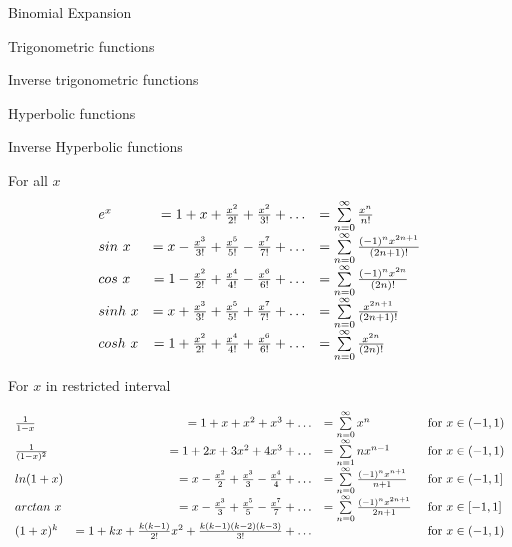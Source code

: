 \begin{framed}
 Binomial Expansion

 Trigonometric functions

 Inverse trigonometric functions

 Hyperbolic functions

 Inverse Hyperbolic functions
\fi

For all $x$
\[
   \begin{array}{l r l}
   e^x &= 1 + x + \frac{x^2}{2!} + \frac{x^2}{3!} + \hdots &= \sum\limits_{n=0}^{\infty}  \frac{x^n}{n!} \\
   sin\ x &= x - \frac{x^3}{3!} + \frac{x^5}{5!} - \frac{x^7}{7!} + \hdots &= \sum\limits_{n=0}^{\infty} \frac{(-1)^n x^{2n+1}}{(2n+1)! } \\
   cos\ x &= 1 - \frac{x^2}{2!} + \frac{x^4}{4!} - \frac{x^6}{6!} + \hdots &= \sum\limits_{n=0}^{\infty}  \frac{(-1)^n x^{2n}}{(2n)!} \\
   sinh\ x &= x + \frac{x^3}{3!} + \frac{x^5}{5!} + \frac{x^7}{7!} + \hdots &= \sum\limits_{n=0}^{\infty} \frac{x^{2n+1}}{(2n+1)! } \\
   cosh\ x &= 1 + \frac{x^2}{2!} + \frac{x^4}{4!} + \frac{x^6}{6!} + \hdots &= \sum\limits_{n=0}^{\infty}  \frac{ x^{2n}}{(2n)!}
\end{array}
\] 

For $x$ in restricted interval

\[
\begin{array}{l r l l}
   \frac{1}{1-x} &= 1 + x + x^2 + x^3 + \hdots &= \sum\limits_{n=0}^{\infty}  x^n & \text{ for $x \in (-1, 1)$} \\
   \frac{1}{(1-x)^2} &= 1 + 2x + 3x^2 + 4x^3 + \hdots &= \sum\limits_{n=1}^{\infty}  nx^{n-1} & \text{ for $x \in (-1, 1)$} \\
   ln(1+x) &= x - \frac{x^2}{2} + \frac{x^3}{3} - \frac{x^4}{4} + \hdots &= \sum\limits_{n=0}^{\infty} \frac{(-1)^n x^{n+1}}{n+1} & \text{ for $x \in (-1, 1]$} \\
   arctan\ x &= x - \frac{x^3}{3} + \frac{x^5}{5} - \frac{x^7}{7} + \hdots &= \sum\limits_{n=0}^{\infty} \frac{(-1)^n x^{2n+1}}{2n+1} & \text{ for $x \in [-1, 1]$} \\
   (1+x)^k &= 1 + kx + \frac{k(k-1)}{2!}x^2 + \frac{k(k-1)(k-2)(k-3)}{3!} + \hdots & & \text{ for $x \in (-1, 1)$} \\
  
\end{array}
\] 



\end{framed}

